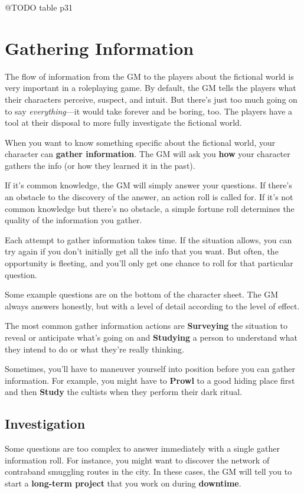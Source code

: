 \documentclass[11pt,oneside]{book}
\newcommand{\gameterm}[1]{\textbf{#1}}
\begin{document}
@TODO table p31

\chapter{Gathering Information}

The flow of information from the GM to the players about the fictional world is very important in a roleplaying game. By default, the GM tells the players what their characters perceive, suspect, and intuit. But there’s just too much going on to say \emph{everything}---it would take forever and be boring, too. The players have a tool at their disposal to more fully investigate the fictional world.

When you want to know something specific about the fictional world, your character can \textbf{gather information}. The GM will ask you \textbf{how} your character gathers the info (or how they learned it in the past).

If it’s common knowledge, the GM will simply answer your questions. If there’s an obstacle to the discovery of the answer, an action roll is called for. If it’s not common knowledge but there’s no obstacle, a simple fortune roll determines the quality of the information you gather.

Each attempt to gather information takes time. If the situation allows, you can try again if you don’t initially get all the info that you want. But often, the opportunity is fleeting, and you’ll only get one chance to roll for that particular question.

Some example questions are on the bottom of the character sheet. The GM always answers honestly, but with a level of detail according to the level of effect.

The most common gather information actions are \gameterm{Surveying}  the situation to reveal or anticipate what’s going on and \gameterm{Studying}  a person to understand what they intend to do or what they’re really thinking.

Sometimes, you’ll have to maneuver yourself into position before you can gather information. For example, you might have to \gameterm{Prowl}  to a good hiding place first and then \gameterm{Study}  the cultists when they perform their dark ritual.

\section{Investigation}

Some questions are too complex to answer immediately with a single gather information roll. For instance, you might want to discover the network of contraband smuggling routes in the city. In these cases, the GM will tell you to start a \textbf{long-term project} that you work on during \textbf{downtime}.
\end{document}
